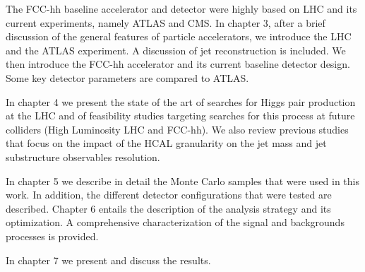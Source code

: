 The FCC-hh baseline accelerator and detector were highly based on LHC and its current experiments, namely ATLAS and CMS. In chapter 3, after a brief discussion of the general features of particle accelerators, we introduce the LHC and the ATLAS experiment. A discussion of jet reconstruction is included. We then introduce the FCC-hh accelerator and its current baseline detector design. Some key detector parameters are compared to ATLAS.

In chapter 4 we present the state of the art of searches for Higgs pair production at the LHC and of feasibility studies targeting searches for this process at future colliders (High Luminosity LHC and FCC-hh). We also review previous studies that focus on the impact of the HCAL granularity on the jet mass and jet substructure observables resolution.

In chapter 5 we describe in detail the Monte Carlo samples that were used in this work. In addition, the different detector configurations that were tested are described. Chapter 6 entails the description of the analysis strategy and its optimization. A comprehensive characterization of the signal and backgrounds processes is provided. 

In chapter 7 we present and discuss the results.


